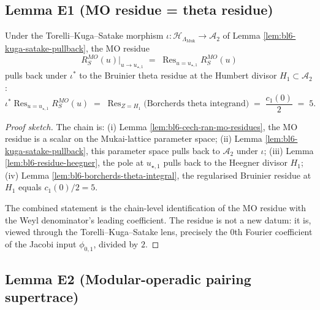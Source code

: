 \subsection*{Lemma E1 (MO residue = theta residue)}

\begin{lemma}
\label{lem:bl6-mo-residue-equals-theta-residue}
Under the Torelli--Kuga--Satake morphism
$\iota\colon \mathcal H_{\Lambda_{\mathrm{Muk}}} \to \mathcal A_{2}$
of Lemma \ref{lem:bl6-kuga-satake-pullback}, the MO residue
\[
   R^{MO}_{S}(u)
     \big|_{u \to u_{\star, 1}}
     \;=\;
   \mathop{\mathrm{Res}}_{u = u_{\star, 1}}
     R^{MO}_{S}(u)
\]
pulls back under $\iota^{*}$ to the Bruinier theta residue at the
Humbert divisor $H_{1} \subset \mathcal A_{2}$:
\[
   \iota^{*}\!
   \mathop{\mathrm{Res}}_{u = u_{\star, 1}}
     R^{MO}_{S}(u)
     \;=\;
   \mathop{\mathrm{Res}}_{Z = H_{1}}
     \bigl(\text{Borcherds theta integrand}\bigr)
     \;=\;
   \frac{c_1(0)}{2}
     \;=\; 5.
\]
\end{lemma}

\begin{proof}[Proof sketch]
The chain is: (i) Lemma \ref{lem:bl6-cech-ran-mo-residues}, the MO
residue is a scalar on the Mukai-lattice parameter space; (ii)
Lemma \ref{lem:bl6-kuga-satake-pullback}, this parameter space pulls
back to $\mathcal A_{2}$ under $\iota$; (iii) Lemma
\ref{lem:bl6-residue-heegner}, the pole at $u_{\star, 1}$ pulls back
to the Heegner divisor $H_{1}$; (iv) Lemma
\ref{lem:bl6-borcherds-theta-integral}, the regularised Bruinier
residue at $H_{1}$ equals $c_1(0)/2 = 5$.

The combined statement is the chain-level identification of the MO
residue with the Weyl denominator's leading coefficient. The residue
is not a new datum: it is, viewed through the Torelli--Kuga--Satake
lens, precisely the $0$th Fourier coefficient of the Jacobi input
$\phi_{0, 1}$, divided by $2$.
\end{proof}

\subsection*{Lemma E2 (Modular-operadic pairing supertrace)}

